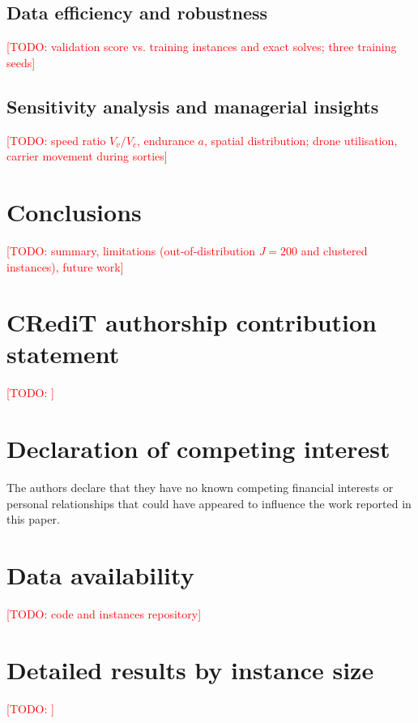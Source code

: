\documentclass[preprint,review,12pt,authoryear]{elsarticle}
\newcommand{\todo}[1]{\textcolor{red}{[TODO: #1]}}
\begin{document}
\subsection{Data efficiency and robustness}
\todo{validation score vs. training instances and exact solves; three training seeds}

\subsection{Sensitivity analysis and managerial insights}
\todo{speed ratio $V_v/V_c$, endurance $a$, spatial distribution; drone utilisation, carrier movement during sorties}

\section{Conclusions}\label{sec:conc}
\todo{summary, limitations (out-of-distribution $J=200$ and clustered instances), future work}

\section*{CRediT authorship contribution statement}
\todo{}
\section*{Declaration of competing interest}
The authors declare that they have no known competing financial interests or personal relationships
that could have appeared to influence the work reported in this paper.
\section*{Data availability}
\todo{code and instances repository}




\appendix
\section{Detailed results by instance size}\label{app:detail}
\todo{}
\end{document}
